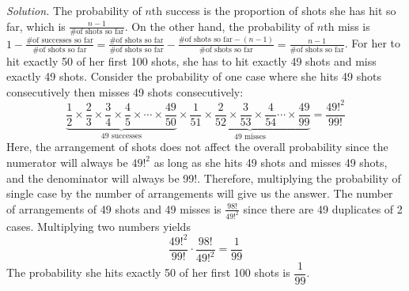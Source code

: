 \documentclass[12pt, oneside]{article}
\begin{document}
\emph{Solution.} The probability of $n$th success is the proportion of shots she has hit so far, which is $\frac{n - 1}{\text{\# of shots so far}}$. On the other hand, the probability of $n$th miss is $1 - \frac{\text{\# of successes so far}}{\text{\# of shots so far}} = \frac{\text{\# of shots so far}}{\text{\# of shots so far}} - \frac{\text{\# of shots so far} - (n - 1)}{\text{\# of shots so far}} = \frac{n-1}{\text{\# of shots so far}}$. For her to hit exactly 50 of her first 100 shots, she has to hit exactly 49 shots and miss exactly 49 shots. Consider the probability of one case where she hits 49 shots consecutively then misses 49 shots consecutively: 
\[
\underbrace{\frac{1}{2} \times \frac{2}{3} \times \frac{3}{4} \times \frac{4}{5} \times \cdots \times \frac{49}{50}}_\text{49 successes} \times \underbrace{\frac{1}{51} \times \frac{2}{52} \times \frac{3}{53} \times \frac{4}{54} \cdots \times \frac{49}{99}}_\text{49 misses} = \frac{49!^2}{99!}
\]
Here, the arrangement of shots does not affect the overall probability since the numerator will always be $49!^2$ as long as she hits 49 shots and misses 49 shots, and the denominator will always be 99!. Therefore, multiplying the probability of single case by the number of arrangements will give us the answer. The number of arrangements of 49 shots and 49 misses is $\frac{98!}{49!^2}$ since there are 49 duplicates of 2 cases. Multiplying two numbers yields
\[
\frac{49!^2}{99!} \cdot \frac{98!}{49!^2} = \frac{1}{99}
\]
The probability she hits exactly 50 of her first 100 shots is $\dfrac{1}{99}$.
\pagebreak
\end{document}
